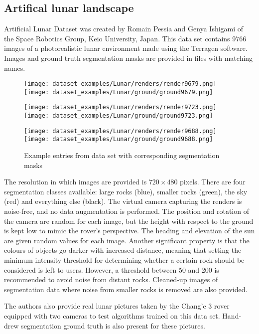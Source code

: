 \documentclass[a4paper,twoside,12pt]{book}
\begin{document}
\subsection{Artifical lunar landscape}
Artificial Lunar Dataset was created by Romain Pessia and Genya Ishigami of the Space Robotics Group, Keio University, Japan. This data set contains 9766 images of a photorealistic lunar environment made using the Terragen software. Images and ground truth segmentation masks are provided in files with matching names.

\begin{figure}[ht!]
    \centering
    \texttt{[image: dataset\_examples/Lunar/renders/render9679.png]}
    \texttt{[image: dataset\_examples/Lunar/ground/ground9679.png]}

    \texttt{[image: dataset\_examples/Lunar/renders/render9723.png]}
    \texttt{[image: dataset\_examples/Lunar/ground/ground9723.png]}

    \texttt{[image: dataset\_examples/Lunar/renders/render9688.png]}
    \texttt{[image: dataset\_examples/Lunar/ground/ground9688.png]}
    \caption{Example entries from data set with corresponding segmentation masks}
    \label{fig:data_example1}
\end{figure}

The resolution in which images are provided is $720 \times 480$ pixels. There are four segmentation classes available: large rocks (blue), smaller rocks (green), the sky (red) and everything else (black). The virtual camera capturing the renders is noise-free, and no data augmentation is performed. The position and rotation of the camera are random for each image, but the height with respect to the ground is kept low to mimic the rover's perspective. The heading and elevation of the sun are given random values for each image. Another significant property is that the colours of objects go darker with increased distance, meaning that setting the minimum intensity threshold for determining whether a certain rock should be considered is left to users. However, a threshold between 50 and 200 is recommended to avoid noise from distant rocks. Cleaned-up images of segmentation data where noise from smaller rocks is removed are also provided.

The authors also provide real lunar pictures taken by the Chang'e 3 rover equipped with two cameras to test algorithms trained on this data set. Hand-drew segmentation ground truth is also present for these pictures.
\end{document}
